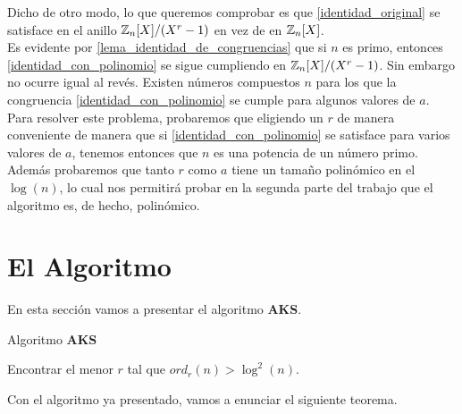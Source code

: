 Dicho de otro modo, lo que queremos comprobar es que \eqref{identidad_original} se satisface en el anillo $\mathbb{Z}_n[X]/(X^r-1)$ en vez de en $\mathbb{Z}_n[X]$.\\

Es evidente por \autoref{lema_identidad_de_congruencias} que si $n$ es primo, entonces \eqref{identidad_con_polinomio} se sigue cumpliendo en $\mathbb{Z}_n[X]/(X^r-1)$. Sin embargo no ocurre igual al revés. Existen números compuestos $n$ para los que la congruencia \eqref{identidad_con_polinomio} se cumple para algunos valores de $a$.\\

Para resolver este problema, probaremos que eligiendo un $r$ de manera conveniente de manera que si \eqref{identidad_con_polinomio} se satisface para varios valores de $a$, tenemos entonces que $n$ es una potencia de un número primo.\\

Además probaremos que tanto $r$ como $a$ tiene un tamaño polinómico en el $\log(n)$, lo cual nos permitirá probar en la segunda parte del trabajo que el algoritmo es, de hecho, polinómico.

\section{El Algoritmo}

En esta sección vamos a presentar el algoritmo \textbf{AKS}.

\begin{algorithm}[H]
	\caption{Algoritmo \textbf{AKS}}\label{aks_algorithm}
	\begin{algorithmic}[1]
				\State {}
			\EndIf
			\State
			\State Encontrar el menor $r$ tal que $ord_r(n) > \log^2(n)$.
			\State
				\State {}
			\EndIf
			\State
				\State {}
			\EndIf
			\State
					\State {}
				\EndIf
			\EndFor
			\State
			\State {}
		\EndProcedure
	\end{algorithmic}
\end{algorithm}

Con el algoritmo ya presentado, vamos a enunciar el siguiente teorema.

